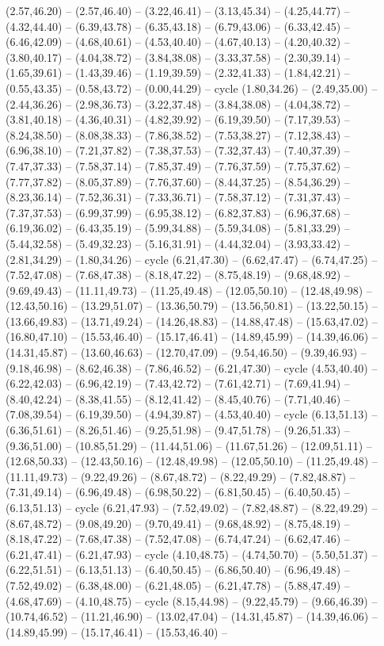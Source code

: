 {(2.57,46.20) -- (2.57,46.40) -- (3.22,46.41) -- (3.13,45.34) -- (4.25,44.77) -- (4.32,44.40) -- (6.39,43.78) -- (6.35,43.18) -- (6.79,43.06) -- (6.33,42.45) -- (6.46,42.09) -- (4.68,40.61) -- (4.53,40.40) -- (4.67,40.13) -- (4.20,40.32) -- (3.80,40.17) -- (4.04,38.72) -- (3.84,38.08) -- (3.33,37.58) -- (2.30,39.14) -- (1.65,39.61) -- (1.43,39.46) -- (1.19,39.59) -- (2.32,41.33) -- (1.84,42.21) -- (0.55,43.35) -- (0.58,43.72) -- (0.00,44.29) -- cycle (1.80,34.26) -- (2.49,35.00) -- (2.44,36.26) -- (2.98,36.73) -- (3.22,37.48) -- (3.84,38.08) -- (4.04,38.72) -- (3.81,40.18) -- (4.36,40.31) -- (4.82,39.92) -- (6.19,39.50) -- (7.17,39.53) -- (8.24,38.50) -- (8.08,38.33) -- (7.86,38.52) -- (7.53,38.27) -- (7.12,38.43) -- (6.96,38.10) -- (7.21,37.82) -- (7.38,37.53) -- (7.32,37.43) -- (7.40,37.39) -- (7.47,37.33) -- (7.58,37.14) -- (7.85,37.49) -- (7.76,37.59) -- (7.75,37.62) -- (7.77,37.82) -- (8.05,37.89) -- (7.76,37.60) -- (8.44,37.25) -- (8.54,36.29) -- (8.23,36.14) -- (7.52,36.31) -- (7.33,36.71) -- (7.58,37.12) -- (7.31,37.43) -- (7.37,37.53) -- (6.99,37.99) -- (6.95,38.12) -- (6.82,37.83) -- (6.96,37.68) -- (6.19,36.02) -- (6.43,35.19) -- (5.99,34.88) -- (5.59,34.08) -- (5.81,33.29) -- (5.44,32.58) -- (5.49,32.23) -- (5.16,31.91) -- (4.44,32.04) -- (3.93,33.42) -- (2.81,34.29) -- (1.80,34.26) -- cycle (6.21,47.30) -- (6.62,47.47) -- (6.74,47.25) -- (7.52,47.08) -- (7.68,47.38) -- (8.18,47.22) -- (8.75,48.19) -- (9.68,48.92) -- (9.69,49.43) -- (11.11,49.73) -- (11.25,49.48) -- (12.05,50.10) -- (12.48,49.98) -- (12.43,50.16) -- (13.29,51.07) -- (13.36,50.79) -- (13.56,50.81) -- (13.22,50.15) -- (13.66,49.83) -- (13.71,49.24) -- (14.26,48.83) -- (14.88,47.48) -- (15.63,47.02) -- (16.80,47.10) -- (15.53,46.40) -- (15.17,46.41) -- (14.89,45.99) -- (14.39,46.06) -- (14.31,45.87) -- (13.60,46.63) -- (12.70,47.09) -- (9.54,46.50) -- (9.39,46.93) -- (9.18,46.98) -- (8.62,46.38) -- (7.86,46.52) -- (6.21,47.30) -- cycle (4.53,40.40) -- (6.22,42.03) -- (6.96,42.19) -- (7.43,42.72) -- (7.61,42.71) -- (7.69,41.94) -- (8.40,42.24) -- (8.38,41.55) -- (8.12,41.42) -- (8.45,40.76) -- (7.71,40.46) -- (7.08,39.54) -- (6.19,39.50) -- (4.94,39.87) -- (4.53,40.40) -- cycle (6.13,51.13) -- (6.36,51.61) -- (8.26,51.46) -- (9.25,51.98) -- (9.47,51.78) -- (9.26,51.33) -- (9.36,51.00) -- (10.85,51.29) -- (11.44,51.06) -- (11.67,51.26) -- (12.09,51.11) -- (12.68,50.33) -- (12.43,50.16) -- (12.48,49.98) -- (12.05,50.10) -- (11.25,49.48) -- (11.11,49.73) -- (9.22,49.26) -- (8.67,48.72) -- (8.22,49.29) -- (7.82,48.87) -- (7.31,49.14) -- (6.96,49.48) -- (6.98,50.22) -- (6.81,50.45) -- (6.40,50.45) -- (6.13,51.13) -- cycle (6.21,47.93) -- (7.52,49.02) -- (7.82,48.87) -- (8.22,49.29) -- (8.67,48.72) -- (9.08,49.20) -- (9.70,49.41) -- (9.68,48.92) -- (8.75,48.19) -- (8.18,47.22) -- (7.68,47.38) -- (7.52,47.08) -- (6.74,47.24) -- (6.62,47.46) -- (6.21,47.41) -- (6.21,47.93) -- cycle (4.10,48.75) -- (4.74,50.70) -- (5.50,51.37) -- (6.22,51.51) -- (6.13,51.13) -- (6.40,50.45) -- (6.86,50.40) -- (6.96,49.48) -- (7.52,49.02) -- (6.38,48.00) -- (6.21,48.05) -- (6.21,47.78) -- (5.88,47.49) -- (4.68,47.69) -- (4.10,48.75) -- cycle (8.15,44.98) -- (9.22,45.79) -- (9.66,46.39) -- (10.74,46.52) -- (11.21,46.90) -- (13.02,47.04) -- (14.31,45.87) -- (14.39,46.06) -- (14.89,45.99) -- (15.17,46.41) -- (15.53,46.40) -- }
